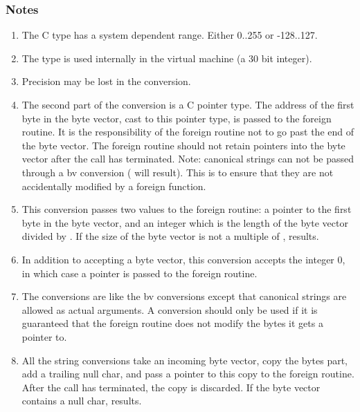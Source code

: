 \documentclass[letterpaper,10pt,english]{sphinxmanual}
\begin{document}
\subsubsection{Notes}
\label{\detokenize{vmref:notes}}\begin{enumerate}
\item {} 
The C type  has a system dependent range. Either 0..255 or -128..127.

\item {} 
The type  is used internally in the virtual machine (a 30 bit integer).

\item {} 
Precision may be lost in the conversion.

\item {} 
The second part of the conversion is a C pointer type. The address of the first byte in the byte
vector, cast to this pointer type, is passed to the foreign routine. It is the responsibility of
the foreign routine not to go past the end of the byte vector. The foreign routine should not retain
pointers into the byte vector after the call has terminated. Note: canonical strings can not be passed
through a bv conversion ( will result). This is to ensure that they are not accidentally
modified by a foreign function.

\item {} 
This conversion passes two values to the foreign routine: a pointer to the first byte in the byte
vector, and an integer which is the length of the byte vector divided by . If
the size of the byte vector is not a multiple of ,  results.

\item {} 
In addition to accepting a byte vector, this conversion accepts the integer 0, in which case a 
pointer is passed to the foreign routine.

\item {} 
The  conversions are like the bv conversions except that canonical strings are allowed as actual
arguments. A  conversion should only be used if it is guaranteed that the foreign routine
does not modify the bytes it gets a pointer to.

\item {} 
All the string conversions take an incoming byte vector, copy the bytes part, add a trailing null
char, and pass a pointer to this copy to the foreign routine. After the call has terminated, the copy
is discarded. If the byte vector contains a null char,  results.


\end{enumerate}
\end{document}
